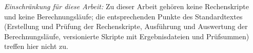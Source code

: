 \documentclass[11pt,a4paper]{article}
\theoremstyle{definition}
\theoremstyle{plain}
\theoremstyle{definition}
\begin{document}
{}


\medskip

\noindent
\emph{Einschränkung für diese Arbeit:} Zu dieser Arbeit gehören keine Rechenskripte
und keine Berechnungsläufe; die entsprechenden Punkte des Standardtextes
(Erstellung und Prüfung der Rechenskripte, Ausführung und Auswertung der
Berechnungsläufe, versionierte Skripte mit Ergebnisdateien und Prüfsummen) treffen
hier nicht zu.
\end{document}
